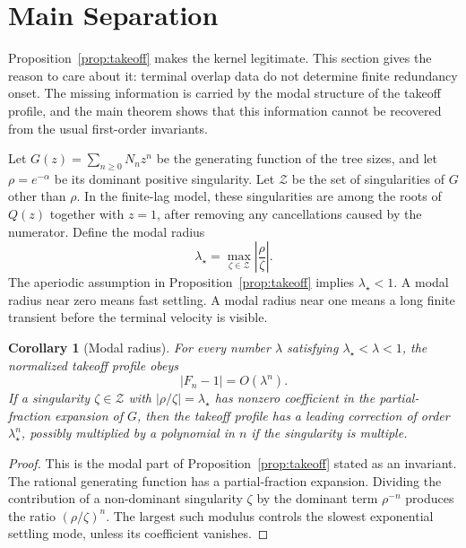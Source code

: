 \documentclass[10pt,twocolumn]{article}
\newtheorem{corollary}{Corollary}
\begin{document}
\section{Main Separation}

Proposition~\ref{prop:takeoff} makes the kernel legitimate.  This section gives the reason to care about it: terminal overlap data do not determine finite redundancy onset.  The missing information is carried by the modal structure of the takeoff profile, and the main theorem shows that this information cannot be recovered from the usual first-order invariants.

Let \(G(z)=\sum_{n\ge0}N_nz^n\) be the generating function of the tree sizes, and let \(\rho=e^{-\alpha}\) be its dominant positive singularity.  Let \(\mathcal{Z}\) be the set of singularities of \(G\) other than \(\rho\).  In the finite-lag model, these singularities are among the roots of \(Q(z)\) together with \(z=1\), after removing any cancellations caused by the numerator.  Define the modal radius
\[
        \lambda_\star
        =
        \max_{\zeta\in\mathcal{Z}}
        \left|\frac{\rho}{\zeta}\right|.
\]
The aperiodic assumption in Proposition~\ref{prop:takeoff} implies \(\lambda_\star<1\).  A modal radius near zero means fast settling.  A modal radius near one means a long finite transient before the terminal velocity is visible.

\begin{corollary}[Modal radius]\label{cor:modal}
For every number \(\lambda\) satisfying \(\lambda_\star<\lambda<1\), the normalized takeoff profile obeys
\[
        |F_n-1|=O(\lambda^n).
\]
If a singularity \(\zeta\in\mathcal{Z}\) with \(|\rho/\zeta|=\lambda_\star\) has nonzero coefficient in the partial-fraction expansion of \(G\), then the takeoff profile has a leading correction of order \(\lambda_\star^n\), possibly multiplied by a polynomial in \(n\) if the singularity is multiple.
\end{corollary}

\begin{proof}
This is the modal part of Proposition~\ref{prop:takeoff} stated as an invariant.  The rational generating function has a partial-fraction expansion.  Dividing the contribution of a non-dominant singularity \(\zeta\) by the dominant term \(\rho^{-n}\) produces the ratio \((\rho/\zeta)^n\).  The largest such modulus controls the slowest exponential settling mode, unless its coefficient vanishes.
\end{proof}
\end{document}
